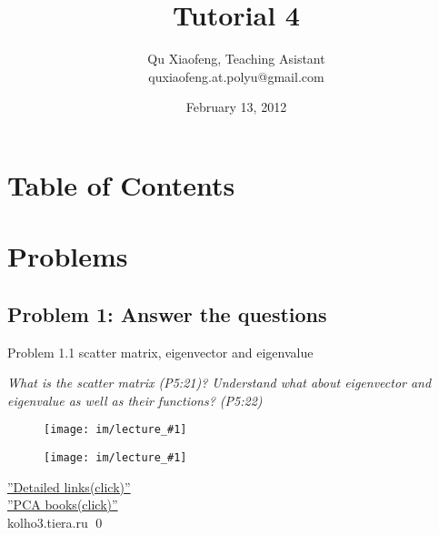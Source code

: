 \documentclass[
        ]{beamer}
\title{Tutorial 4}
\author[COMP435p]{Qu Xiaofeng\texorpdfstring{, Teaching Asistant\\\tiny{quxiaofeng.at.polyu@gmail.com}}{}}
\institute{COMP435p\\Biometrics Authentication}
\date{February 13, 2012}
\begin{document}
\newcommand{\inpdfu}[2]{\begin{figure}\centering\texttt{[image: im/lecture\_\#1]}\end{figure}}
\newcommand{\inpdfl}[2]{\begin{figure}\centering\texttt{[image: im/lecture\_\#1]}\end{figure}}
\newcommand{\inpng}[1]{\begin{figure}\centering\texttt{[image: im/\#1]}\end{figure}}

\frame{\titlepage}

\section*{Table of Contents}

    \begin{frame}{\secname}
        \tableofcontents
    \end{frame}




\section{Problems}

    \subsection{Problem 1: Answer the questions}
    
    		\begin{frame}[c]{Problem 1.1 scatter matrix, eigenvector and eigenvalue}
    			\begin{overprint}
    			\emph{What is the scatter matrix (P5:21)? Understand what about eigenvector and eigenvalue as well as their functions? (P5:22)}
    				\onslide<2> \inpdfu{5}{11} %
    				 \inpdfl{5}{11} %
    				 $\;$\\
\alert{\href{http://www.google.com.hk/search?gcx=c&sourceid=chrome&ie=UTF-8&q=eigenvalue}{''Detailed links(click)''}}\\	\alert{\href{http://books.google.com.hk/books/about/Principal_component_analysis.html?id=_olByCrhjwIC&redir_esc=y
}{''PCA books(click)''}}\\
							\alert{kolho3.tiera.ru}    		
							\qed		
    			\end{overprint}
    		\end{frame}
    
\end{document}
